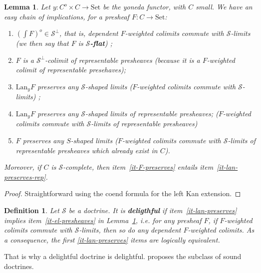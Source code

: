 \documentclass{article}
\newcommand{\Lan}{\text{Lan}}
\newcommand{\Set}{\text{Set}}
\newtheorem{definition}[theorem]{Definition}
\newtheorem{lemma}[theorem]{Lemma}
\begin{document}
  \begin{lemma}
    \label{l:flat-implications}
    Let $y : C^o \times C \rightarrow \Set$ be the yoneda functor, with $C$ small.
We have an easy chain of implications, for a presheaf $F : C \rightarrow \Set$:
\begin{enumerate}
\item $(\int F)^o \in \mathcal{S}^{\bot}$, that is,
  dependent $F$-weighted colimits commute with $\mathcal{S}$-limits
  (we then say that $F$ is \textbf{$\mathcal{S}$-flat}) \label{it-el-presheaves};
\item $F$ is a $\mathcal{S}^{\bot}$-colimit of representable presheaves
  (because it is a $F$-weighted colimit of representable presehaves);
\item $\Lan_yF$ preserves any $\mathcal{S}$-shaped limits
  ($F$-weighted colimits commute with $\mathcal{S}$-limits)
  \label{it-lan-preserves};
\item $\Lan_yF$ preserves any $\mathcal{S}$-shaped limits of representable presheaves;
  ($F$-weighted colimits commute with $\mathcal{S}$-limits of representable presheaves)
  \label{it-lan-preserves-rep}
  \item $F$ preserves any $S$-shaped limits
    ($F$-weighted colimits commute with $\mathcal{S}$-limits of representable
    presheaves which already exist in $C$).
    \label{it-F-preserves}
\end{enumerate}
Moreover, if $C$ is $\mathcal{S}$-complete, then
item~\ref{it-F-preserves} entails item~\ref{it-lan-preserves-rep}.
\end{lemma}
\begin{proof}
 Straightforward using the coend formula for the left Kan extension. 
\end{proof}
\begin{definition}
  Let $\mathcal{S}$ be a doctrine.
  It is \textbf{deligthful} if 
  item~\ref{it-lan-preserves} implies item~\ref{it-el-presheaves} 
  in Lemma~\ref{l:flat-implications}, i.e. for any presheaf $F$, if $F$-weighted
  colimits commute with $\mathcal{S}$-limits, then so do any dependent $F$-weighted colimits.
  As a consequence, the first \ref{it-lan-preserves} items
  are logically equivalent.
\end{definition}
That is why a delightful doctrine is delightful.
\cite{lack_accessible} proposes the subclass of sound doctrines.
\end{document}
